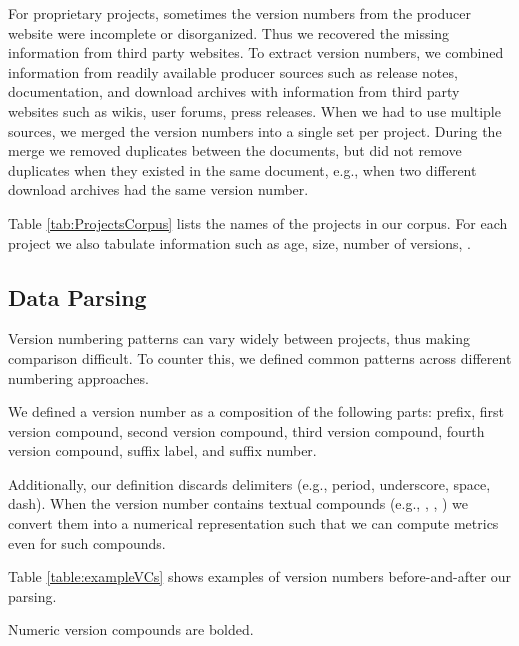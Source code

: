 \documentclass[conference]{IEEEtran}
\begin{document}
For proprietary projects, sometimes the version numbers from the producer website
were incomplete or disorganized. Thus we recovered the missing information from third party websites.
To extract version numbers, we combined information from readily available producer sources such as release notes, documentation, and download archives
with information from third party websites such as wikis, user forums, press releases.
When we had to use multiple sources, we merged the version numbers into a single set per project. During the merge we removed duplicates between the documents, but did not remove duplicates when they existed in the same document, e.g., when two different download archives had the same version number.

Table \ref{tab:ProjectsCorpus} lists the names of the projects in our corpus. For each project we also tabulate information such as age, size, number of versions, .

\subsection{Data Parsing}

 Version numbering patterns can vary widely between projects, thus making comparison difficult. 
To counter this, we defined common patterns across different numbering approaches. 

We defined a version number as a composition of the following parts: 
prefix, first version compound, second
 version compound, third version compound, fourth version compound, suffix label, and suffix number. 

Additionally, our definition discards delimiters (e.g., period, underscore, space, dash). When the version number contains textual compounds (e.g., , , ) we convert them into a numerical representation such that we can compute metrics even for such compounds. 

Table \ref{table:exampleVCs} shows examples of version numbers before-and-after 
our parsing.
 
 \begin{table*}[t]
 \begin{center}
 \begin{adjustbox}{width=\textwidth}

\end{adjustbox}
\end{center}
\caption{Numeric version compounds are bolded. }
\label{table:exampleVCs}
\end{table*}
 
\end{document}
